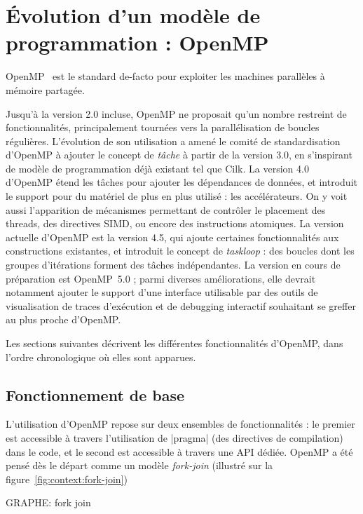 \section{Évolution d'un modèle de programmation : OpenMP}\label{sec:context:openmp}

OpenMP~\cite{openmp45} est le standard de-facto pour exploiter les machines parallèles à mémoire partagée.

Jusqu'à la version 2.0 incluse, OpenMP ne proposait qu'un nombre restreint de fonctionnalités, principalement tournées vers la parallélisation de boucles régulières.
L'évolution de son utilisation a amené le comité de standardisation d'OpenMP à ajouter le concept de \emph{tâche} à partir de la version 3.0, en s'inspirant de modèle de programmation déjà existant tel que Cilk.
La version 4.0 d'OpenMP étend les tâches pour ajouter les dépendances de données, et introduit le support pour du matériel de plus en plus utilisé : les accélérateurs.
On y voit aussi l'apparition de mécanismes permettant de contrôler le placement des threads, des directives SIMD, ou encore des instructions atomiques.
La version actuelle d'OpenMP est la version 4.5, qui ajoute certaines fonctionnalités aux constructions existantes, et introduit le concept de \emph{taskloop} : des boucles dont les groupes d'itérations forment des tâches indépendantes.
La version en cours de préparation est OpenMP~5.0 ; parmi diverses améliorations, elle devrait notamment ajouter le support d'une interface utilisable par des outils de visualisation de traces d'exécution et de debugging interactif souhaitant se greffer au plus proche d'OpenMP.

Les sections suivantes décrivent les différentes fonctionnalités d'OpenMP, dans l'ordre chronologique où elles sont apparues.

\subsection{Fonctionnement de base}



L'utilisation d'OpenMP repose sur deux ensembles de fonctionnalités : le premier est accessible à travers l'utilisation de |pragma| (des directives de compilation) dans le code, et le second est accessible à travers une API dédiée.
OpenMP a été pensé dès le départ comme un modèle \emph{fork-join} (illustré sur la figure~\ref{fig:context:fork-join})

\begin{todo}
GRAPHE: \label{fig:context:fork-join}fork join
\end{todo}

